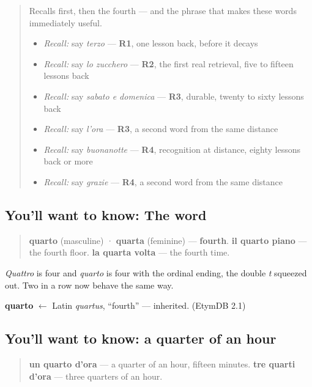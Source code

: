 \label{lesson:IT-C26-quarto}



\begin{quote}
Recalls first, then the fourth — and the phrase that makes these words immediately useful.

\begin{itemize}
\raggedright
  \item \emph{Recall:} say \emph{terzo} — \textbf{R1}, one lesson back, before it decays
  \item \emph{Recall:} say \emph{lo zucchero} — \textbf{R2}, the first real retrieval, five to fifteen lessons back
  \item \emph{Recall:} say \emph{sabato e domenica} — \textbf{R3}, durable, twenty to sixty lessons back
  \item \emph{Recall:} say \emph{l'ora} — \textbf{R3}, a second word from the same distance
  \item \emph{Recall:} say \emph{buonanotte} — \textbf{R4}, recognition at distance, eighty lessons back or more
  \item \emph{Recall:} say \emph{grazie} — \textbf{R4}, a second word from the same distance
\end{itemize}
\end{quote}

\subsection*{You'll want to know: The word}
\begin{quote}
\textbf{quarto} (masculine) · \textbf{quarta} (feminine) — \textbf{fourth}. \textbf{il quarto piano} — the fourth floor. \textbf{la quarta volta} — the fourth time.
\end{quote}

\emph{Quattro} is four and \emph{quarto} is four with the ordinal ending, the double \emph{t} squeezed out. Two in a row now behave the same way.

\begin{cousinweb}
\textbf{quarto} $\leftarrow$ Latin \emph{quartus}, \textquotedblleft{}fourth\textquotedblright{} — inherited. (EtymDB 2.1)
\end{cousinweb}

\subsection*{You'll want to know: a quarter of an hour}
\begin{quote}
\textbf{un quarto d'ora} — a quarter of an hour, fifteen minutes. \textbf{tre quarti d'ora} — three quarters of an hour.
\end{quote}

